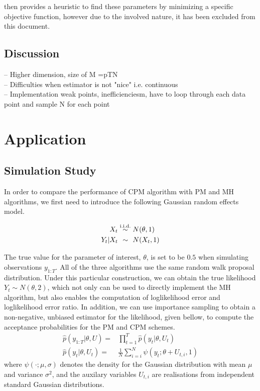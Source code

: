 \documentclass{article}
\begin{document}
\cite{cpmmDeligiannidis2015} then provides a heuristic to find these parameters by minimizing a specific objective function, however due to the involved nature, it has been excluded from this document.



\subsection{Discussion}
    -- Higher dimension, size of M =pTN \\
    -- Difficulties when estimator is not "nice" i.e. continuous \\
    -- Implementation weak points, inefficienciesm, have to loop through each data point and sample N for each point



  \section{Application}






  \subsection{Simulation Study}
  In order to compare the performance of CPM algorithm with PM and MH algorithms, we first need to introduce the following Gaussian random effects model.

  \begin{align*}
  X_t &\overset{\text{i.i.d.}}{\sim} N(\theta, 1) \\
  Y_t | X_t &\overset{\hphantom{\text{i.i.d.}}}{\sim} N(X_t, 1)
  \end{align*}

The true value for the parameter of interest, $\theta$, is set to be $0.5$ when simulating observations $y_{1:T}$. All of the three algorithms use the same random walk proposal distribution. Under this particular construction, we can obtain the true likelihood $Y_t \sim N(\theta, 2)$, which not only can be used to directly implement the MH algorithm, but also enables the computation of loglikelihood error and loglikelihood error ratio. In addition, we can use importance sampling to obtain a non-negative, unbiased estimator for the likelihood, given bellow, to compute the acceptance probabilities for the PM and CPM schemes.
\begin{align*}
\hat{p}(y_{1:T}| \theta, U) =& \prod_{t=1}^{T} \hat{p}(y_t|\theta, U_t) \\
\hat{p}(y_t| \theta, U_t)=& \frac{1}{N} \sum_{i=i}^N \psi (y_t; \theta + U_{t,i}, 1)
\end{align*}
where $\psi(\cdot; \mu, \sigma)$ denotes the density for the Gaussian distribution with mean $\mu$ and variance $\sigma^2$, and the auxilary variables $U_{t,i}$ are realisations from independent standard Gaussian distributions. \\
\end{document}
